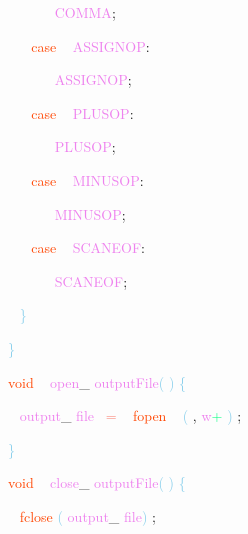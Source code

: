 \documentclass[8, usernames, dvipsnames]{beamer}
\begin{document}
\begin{frame}
\textcolor{White}{\   }
\textcolor{White}{\   }
\textcolor{White}{\   }
\textcolor{OrangeRed}{	}
\textcolor{White}{\ }
\textcolor{Violet}{COMMA}\textcolor{Sepia}{;}

 \textcolor{White}{\   }
\textcolor{White}{\   }
\textcolor{OrangeRed}{case}
\textcolor{White}{\ }
\textcolor{Violet}{ASSIGNOP}\textcolor{Sepia}{:}

 \textcolor{White}{\   }
\textcolor{White}{\   }
\textcolor{White}{\   }
\textcolor{OrangeRed}{	}
\textcolor{White}{\ }
\textcolor{Violet}{ASSIGNOP}\textcolor{Sepia}{;}

 \textcolor{White}{\   }
\textcolor{White}{\   }
\textcolor{OrangeRed}{case}
\textcolor{White}{\ }
\textcolor{Violet}{PLUSOP}\textcolor{Sepia}{:}

 \textcolor{White}{\   }
\textcolor{White}{\   }
\textcolor{White}{\   }
\textcolor{OrangeRed}{	}
\textcolor{White}{\ }
\textcolor{Violet}{PLUSOP}\textcolor{Sepia}{;}

 \textcolor{White}{\   }
\textcolor{White}{\   }
\textcolor{OrangeRed}{case}
\textcolor{White}{\ }
\textcolor{Violet}{MINUSOP}\textcolor{Sepia}{:}

 \textcolor{White}{\   }
\textcolor{White}{\   }
\textcolor{White}{\   }
\textcolor{OrangeRed}{	}
\textcolor{White}{\ }
\textcolor{Violet}{MINUSOP}\textcolor{Sepia}{;}

 \textcolor{White}{\   }
\textcolor{White}{\   }
\textcolor{OrangeRed}{case}
\textcolor{White}{\ }
\textcolor{Violet}{SCANEOF}\textcolor{Sepia}{:}

 \textcolor{White}{\   }
\textcolor{White}{\   }
\textcolor{White}{\   }
\textcolor{OrangeRed}{	}
\textcolor{White}{\ }
\textcolor{Violet}{SCANEOF}\textcolor{Sepia}{;}

 \textcolor{White}{\   }
\textcolor{SkyBlue}{\} }

 \end{frame}
\begin{frame}
\textcolor{SkyBlue}{\} }

 
 
 
 \textcolor{OrangeRed}{void}
\textcolor{White}{\ }
\textcolor{Violet}{open}\textcolor{Sepia}{\_}
\textcolor{Violet}{outputFile}\textcolor{SkyBlue}{(}
\textcolor{SkyBlue}{)}
\textcolor{SkyBlue}{\{ }

 \textcolor{White}{\   }
\textcolor{Violet}{output}\textcolor{Sepia}{\_}
\textcolor{Violet}{file}\textcolor{White}{\ }
\textcolor{Salmon}{=}
\textcolor{White}{\ }
\textcolor{OrangeRed}{fopen}
\textcolor{White}{\ }
\textcolor{SkyBlue}{(}
\textcolor{Sepia}{,}
\textcolor{Violet}{w}\textcolor{SpringGreen}{+}
\textcolor{SkyBlue}{)}
\textcolor{Sepia}{;}

 \textcolor{SkyBlue}{\} }

 
 \textcolor{OrangeRed}{void}
\textcolor{White}{\ }
\textcolor{Violet}{close}\textcolor{Sepia}{\_}
\textcolor{Violet}{outputFile}\textcolor{SkyBlue}{(}
\textcolor{SkyBlue}{)}
\textcolor{SkyBlue}{\{ }

 \textcolor{White}{\   }
\textcolor{OrangeRed}{fclose}
\textcolor{SkyBlue}{(}
\textcolor{Violet}{output}\textcolor{Sepia}{\_}
\textcolor{Violet}{file}\textcolor{SkyBlue}{)}
\textcolor{Sepia}{;}

 \end{frame}
\end{document}
